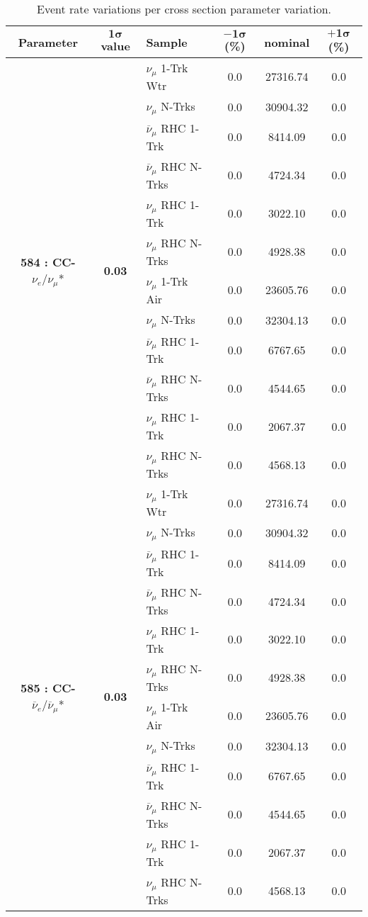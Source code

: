 \begin{table}[ht!]
\centering
\begin{tabular}{ c  c  l  c  c  c }
\midrule[1.3pt]
\textbf{Parameter} & \textbf{$\mathbf{1\sigma}$ value} & \textbf{Sample} & \textbf{$\mathbf{-1\sigma}$ (\%)}  &  \textbf{nominal}  &  \textbf{$\mathbf{+1\sigma}$ (\%)} \\
\midrule[1.3pt]
\multirow{12}{*}{\textbf{584 : CC-}$\nu_e/\nu_\mu$*} & \multirow{12}{*}{\textbf{0.03}} & $\nu_\mu$ 1-Trk Wtr &   0.0 &  27316.74 &   0.0 \\ 
 &  & $\nu_\mu$ N-Trks &   0.0 &  30904.32 &   0.0 \\ 
 &  & $\overline{\nu}_\mu$ RHC 1-Trk &   0.0 &  8414.09 &   0.0 \\ 
 &  & $\overline{\nu}_\mu$ RHC N-Trks &   0.0 &  4724.34 &   0.0 \\ 
 &  & $\nu_\mu$ RHC 1-Trk &   0.0 &  3022.10 &   0.0 \\ 
 &  & $\nu_\mu$ RHC N-Trks &   0.0 &  4928.38 &   0.0 \\ 
 &  & $\nu_\mu$ 1-Trk Air &   0.0 &  23605.76 &   0.0 \\ 
 &  & $\nu_\mu$ N-Trks &   0.0 &  32304.13 &   0.0 \\ 
 &  & $\overline{\nu}_\mu$ RHC 1-Trk &   0.0 &  6767.65 &   0.0 \\ 
 &  & $\overline{\nu}_\mu$ RHC N-Trks &   0.0 &  4544.65 &   0.0 \\ 
 &  & $\nu_\mu$ RHC 1-Trk &   0.0 &  2067.37 &   0.0 \\ 
 &  & $\nu_\mu$ RHC N-Trks &   0.0 &  4568.13 &   0.0 \\ 
\midrule[1.3pt]
\multirow{12}{*}{\textbf{585 : CC-}$\overline{\nu}_e/\overline{\nu}_\mu$*} & \multirow{12}{*}{\textbf{0.03}} & $\nu_\mu$ 1-Trk Wtr &   0.0 &  27316.74 &   0.0 \\ 
 &  & $\nu_\mu$ N-Trks &   0.0 &  30904.32 &   0.0 \\ 
 &  & $\overline{\nu}_\mu$ RHC 1-Trk &   0.0 &  8414.09 &   0.0 \\ 
 &  & $\overline{\nu}_\mu$ RHC N-Trks &   0.0 &  4724.34 &   0.0 \\ 
 &  & $\nu_\mu$ RHC 1-Trk &   0.0 &  3022.10 &   0.0 \\ 
 &  & $\nu_\mu$ RHC N-Trks &   0.0 &  4928.38 &   0.0 \\ 
 &  & $\nu_\mu$ 1-Trk Air &   0.0 &  23605.76 &   0.0 \\ 
 &  & $\nu_\mu$ N-Trks &   0.0 &  32304.13 &   0.0 \\ 
 &  & $\overline{\nu}_\mu$ RHC 1-Trk &   0.0 &  6767.65 &   0.0 \\ 
 &  & $\overline{\nu}_\mu$ RHC N-Trks &   0.0 &  4544.65 &   0.0 \\ 
 &  & $\nu_\mu$ RHC 1-Trk &   0.0 &  2067.37 &   0.0 \\ 
 &  & $\nu_\mu$ RHC N-Trks &   0.0 &  4568.13 &   0.0 \\ 
\midrule[1.3pt]
\end{tabular}
\centering
\caption*{Event rate variations per cross section parameter variation.}
\end{table}
\addtocounter{table}{-1}

